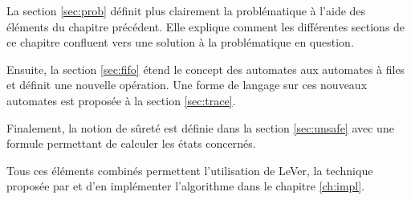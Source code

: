 La section \ref{sec:prob} définit plus clairement la problématique à l'aide des éléments du chapitre précédent. Elle explique comment les différentes sections de ce chapitre confluent vers une solution à la problématique en question.

Ensuite, la section \ref{sec:fifo} étend le concept des automates aux automates à files et définit une nouvelle opération. Une forme de langage sur ces nouveaux automates est proposée à la section \ref{sec:trace}.

Finalement, la notion de sûreté est définie dans la section \ref{sec:unsafe} avec une formule permettant de calculer les états concernés.

Tous ces éléments combinés permettent l'utilisation de LeVer, la technique proposée par \cite{Vardhan04} et d'en implémenter l'algorithme dans le chapitre \ref{ch:impl}.
